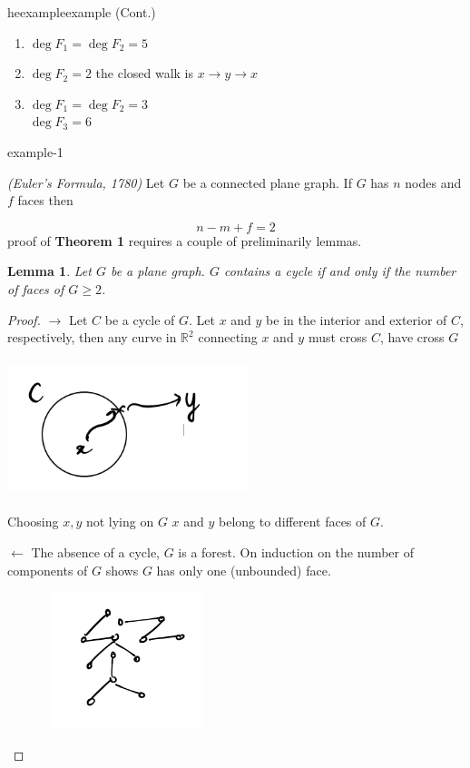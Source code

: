 \documentclass[12pt]{article}
\makeatletter
\newenvironment{theorem}[1]{%
  \renewcommand\themanualtheoreminner{#1}%
  \manualtheoreminner
}{\endmanualtheoreminner}
\newtheorem*{lemma}{Lemma}
\newenvironment{pro}{\begin{proof}}{\end{proof}}
\newenvironment{usecounterof}[2]{%
  \def\@tempb{#1}%
  \expandafter\renewcommand\csname the#1\endcsname{\ref{#2}}\@nameuse\@tempb}{%
    \@nameuse{end\@tempb}\addtocounter\@tempb{-1}}
\makeatother
\begin{document}
\begin{usecounterof}{example}{a-thm} (Cont.)
	\begin{enumerate}
		\item $\deg F_{1} = \deg F_{2} = 5$
		\item $\deg F_{2} = 2$ the closed walk is $x\to y \to x$
		\item $\deg F_{1} = \deg F_{2} = 3$\\
		      $\deg F_{3} = 6$
	\end{enumerate}


\end{usecounterof}


\begin{theorem}{1}
	\textit{(Euler's Formula, 1780)} Let $G$ be a connected plane graph. If $G$ has $n$ nodes and $f$ faces then

	\[n - m + f = 2\]
	proof of \textbf{Theorem 1} requires a couple of preliminarily lemmas.
\end{theorem}

\begin{lemma}
	Let $G$ be a plane graph. $G$ contains a cycle if and only if the number of faces of $G \ge 2$.
\end{lemma}

\begin{pro}
	$\rightarrow$ Let $C$ be a cycle of $G$. Let $x$ and $y$ be in the interior and exterior of $C$, respectively, then any curve in $\mathbb{R}^{2}$ connecting $x$ and $y$ must cross $C$, have cross $G$

	\begin{center}
		\includegraphics[width=7cm,height=4cm]{circle_proof}
	\end{center}

	Choosing $x, y$ not lying on $G$ $x$ and $y$ belong to different faces of $G$.

	$\leftarrow$ The absence of a cycle, $G$ is a forest. On induction on the number of components of $G$ shows $G$ has only one (unbounded) face.

	\begin{center}
		\includegraphics[width=7cm,height=4cm]{circle_proof2}
	\end{center}

\end{pro}
\end{document}
